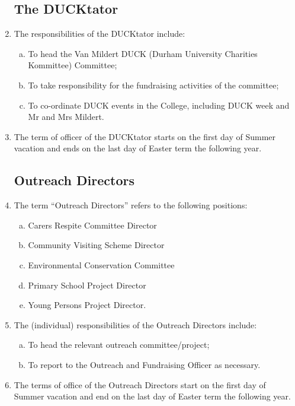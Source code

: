 \documentclass[12pt]{article}
\begin{document}
\begin{enumerate}
    \subsection{The DUCKtator}
    \item The responsibilities of the DUCKtator include:
    \begin{enumerate}[(a)]
        \item To head the Van Mildert DUCK (Durham University Charities Kommittee) Committee;
        \item To take responsibility for the fundraising activities of the committee;
        \item To co-ordinate DUCK events in the College, including DUCK week and Mr and Mrs Mildert.
    \end{enumerate}
    \item The term of officer of the DUCKtator starts on the first day of Summer vacation and ends on the last day of Easter term the following year.
    \subsection{Outreach Directors}
    \item\label{def:outreach-directors} The term “Outreach Directors” refers to the following positions:
    \begin{enumerate}[(a)]
        \item Carers Respite Committee Director
        \item Community Visiting Scheme Director
        \item Environmental Conservation Committee
        \item Primary School Project Director
        \item Young Persons Project Director.
    \end{enumerate}
    \item The (individual) responsibilities of the Outreach Directors include:
    \begin{enumerate}[(a)]
        \item To head the relevant outreach committee/project;
        \item To report to the Outreach and Fundraising Officer as necessary.
    \end{enumerate}
    \item The terms of office of the Outreach Directors start on the first day of Summer vacation and end on the last day of Easter term the following year.


\end{enumerate}
\end{document}
